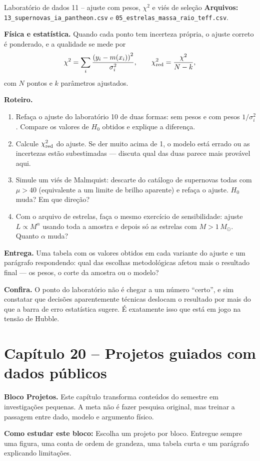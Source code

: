 \documentclass[11pt,a4paper]{article}
\newcommand{\aberturabloco}[3]{%
  \begin{noticebox}
  \textbf{Bloco #1.} #2

  \textbf{Como estudar este bloco:} #3
  \end{noticebox}
}
\begin{document}
\begin{lessonblock}[borderline west={2pt}{0pt}{astroGold}]{Laboratório de dados 11 -- ajuste com pesos, $\chi^2$ e viés de seleção}
\textbf{Arquivos:} \texttt{13\_supernovas\_ia\_pantheon.csv} e \texttt{05\_estrelas\_massa\_raio\_teff.csv}.

\textbf{Física e estatística.} Quando cada ponto tem incerteza própria, o ajuste correto é ponderado, e a qualidade se mede por
\[
\chi^{2}=\sum_i\frac{\left(y_i-m(x_i)\right)^{2}}{\sigma_i^{2}},
\qquad
\chi^{2}_{\rm red}=\frac{\chi^{2}}{N-k},
\]
com $N$ pontos e $k$ parâmetros ajustados.

\textbf{Roteiro.}
\begin{enumerate}
\item Refaça o ajuste do laboratório 10 de duas formas: sem pesos e com pesos $1/\sigma_i^{2}$. Compare os valores de $H_0$ obtidos e explique a diferença.
\item Calcule $\chi^2_{\rm red}$ do ajuste. Se der muito acima de 1, o modelo está errado ou as incertezas estão subestimadas --- discuta qual das duas parece mais provável aqui.
\item Simule um viés de Malmquist: descarte do catálogo de supernovas todas com $\mu>40$ (equivalente a um limite de brilho aparente) e refaça o ajuste. $H_0$ muda? Em que direção?
\item Com o arquivo de estrelas, faça o mesmo exercício de sensibilidade: ajuste $L\propto M^\alpha$ usando toda a amostra e depois só as estrelas com $M>1\,M_\odot$. Quanto $\alpha$ muda?
\end{enumerate}

\textbf{Entrega.} Uma tabela com os valores obtidos em cada variante do ajuste e um parágrafo respondendo: qual das escolhas metodológicas afetou mais o resultado final --- os pesos, o corte da amostra ou o modelo?

\textbf{Confira.} O ponto do laboratório não é chegar a um número ``certo'', e sim constatar que decisões aparentemente técnicas deslocam o resultado por mais do que a barra de erro estatística sugere. É exatamente isso que está em jogo na tensão de Hubble.
\end{lessonblock}

\newpage
\section*{Capítulo 20 -- Projetos guiados com dados públicos}
\aberturabloco{Projetos}{Este capítulo transforma conteúdos do semestre em investigações pequenas. A meta não é fazer pesquisa original, mas treinar a passagem entre dado, modelo e argumento físico.}{Escolha um projeto por bloco. Entregue sempre uma figura, uma conta de ordem de grandeza, uma tabela curta e um parágrafo explicando limitações.}
\end{document}

